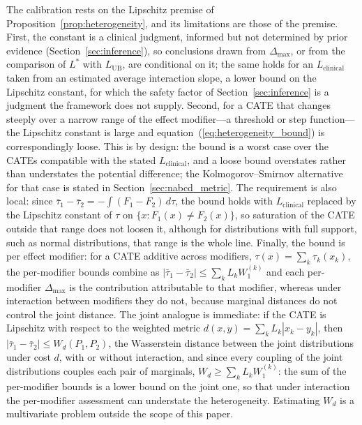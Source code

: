 \documentclass[AMA,Times1COL]{WileyNJDv5}
\begin{document}
The calibration rests on the Lipschitz premise of Proposition~\ref{prop:heterogeneity}, and its limitations are those of the premise. First, the constant is a clinical judgment, informed but not determined by prior evidence (Section~\ref{sec:inference}), so conclusions drawn from $\Delta_{\max}$, or from the comparison of $L^*$ with $L_{\text{UB}}$, are conditional on it; the same holds for an $L_{\text{clinical}}$ taken from an estimated average interaction slope, a lower bound on the Lipschitz constant, for which the safety factor of Section~\ref{sec:inference} is a judgment the framework does not supply. Second, for a CATE that changes steeply over a narrow range of the effect modifier---a threshold or step function---the Lipschitz constant is large and equation~(\ref{eq:heterogeneity_bound}) is correspondingly loose. This is by design: the bound is a worst case over the CATEs compatible with the stated $L_{\text{clinical}}$, and a loose bound overstates rather than understates the potential difference; the Kolmogorov--Smirnov alternative for that case is stated in Section~\ref{sec:nabcd_metric}. The requirement is also local: since $\bar{\tau}_1 - \bar{\tau}_2 = -\int (F_1 - F_2)\,d\tau$, the bound holds with $L_{\text{clinical}}$ replaced by the Lipschitz constant of $\tau$ on $\{x : F_1(x) \neq F_2(x)\}$, so saturation of the CATE outside that range does not loosen it, although for distributions with full support, such as normal distributions, that range is the whole line. Finally, the bound is per effect modifier: for a CATE additive across modifiers, $\tau(x) = \sum_k \tau_k(x_k)$, the per-modifier bounds combine as $|\bar{\tau}_1 - \bar{\tau}_2| \leq \sum_k L_k W_1^{(k)}$ and each per-modifier $\Delta_{\max}$ is the contribution attributable to that modifier, whereas under interaction between modifiers they do not, because marginal distances do not control the joint distance. The joint analogue is immediate: if the CATE is Lipschitz with respect to the weighted metric $d(x, y) = \sum_k L_k |x_k - y_k|$, then $|\bar{\tau}_1 - \bar{\tau}_2| \leq W_d(P_1, P_2)$, the Wasserstein distance between the joint distributions under cost $d$, with or without interaction, and since every coupling of the joint distributions couples each pair of marginals, $W_d \geq \sum_k L_k W_1^{(k)}$: the sum of the per-modifier bounds is a lower bound on the joint one, so that under interaction the per-modifier assessment can understate the heterogeneity. Estimating $W_d$ is a multivariate problem outside the scope of this paper.
\end{document}

